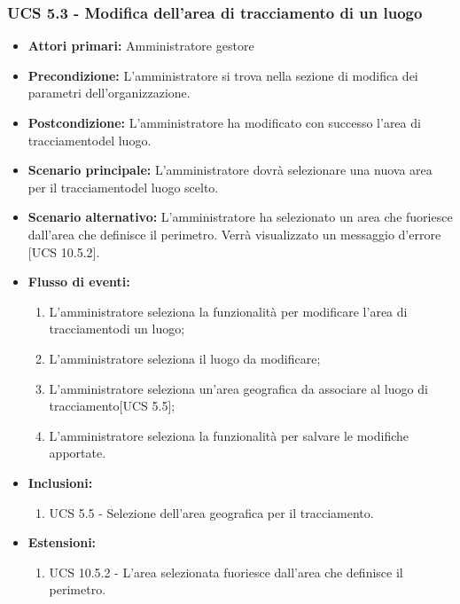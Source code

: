 \subsubsection{UCS 5.3 - Modifica dell'area di tracciamento di un luogo}%
\begin{itemize}
    \item \textbf{Attori primari:} Amministratore gestore
    \item \textbf{Precondizione:} L'amministratore si trova nella sezione di modifica dei parametri dell'organizzazione.
    \item \textbf{Postcondizione:} L'amministratore ha modificato con successo l'area di tracciamentodel luogo.
    \item \textbf{Scenario principale:} L'amministratore dovrà selezionare una nuova area per il tracciamentodel luogo scelto.
    \item \textbf{Scenario alternativo:} L'amministratore ha selezionato un area che fuoriesce dall'area che definisce il perimetro. Verrà visualizzato un messaggio d'errore [UCS 10.5.2].
    \item \textbf{Flusso di eventi:}
    \begin{enumerate}%
        \item L'amministratore seleziona la funzionalità per modificare l'area di tracciamentodi un luogo;
        \item L'amministratore seleziona il luogo da modificare;
        \item L'amministratore seleziona un'area geografica da associare al luogo di tracciamento[UCS 5.5];
        \item L'amministratore seleziona la funzionalità per salvare le modifiche apportate.
    \end{enumerate}
    \item \textbf{Inclusioni:}
    \begin{enumerate}
        \item UCS 5.5 - Selezione dell'area geografica per il tracciamento.
    \end{enumerate}
    \item \textbf{Estensioni:}
    \begin{enumerate}
        \item UCS 10.5.2 - L'area selezionata fuoriesce dall'area che definisce il perimetro.
    \end{enumerate}
\end{itemize}

